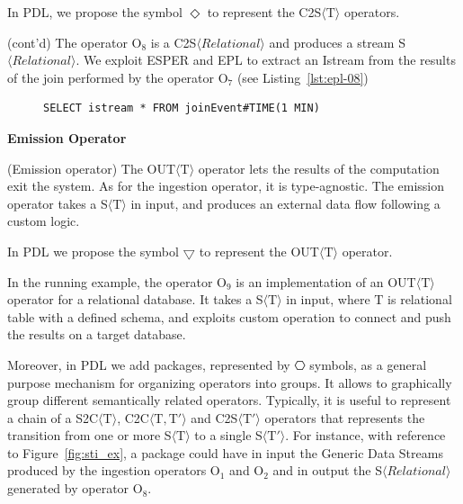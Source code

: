 \noindent
In PDL, we propose the symbol $\Diamond$ to represent the C2S$\langle\mathrm{T}\rangle$ operators. 

\begin{Example}
(cont'd) The operator O$_8$ is a C2S$\langle Relational \rangle$ and produces a stream S$\langle Relational \rangle$. We exploit ESPER and EPL to extract an Istream from the results of the join performed by the operator O$_7$ (see Listing~\ref{lst:epl-08})

\begin{figure}[ht]
\begin{minipage}{0.95\linewidth}
\begin{lstlisting}[caption={EPL query, applied by O$_8$ operator, to create a stream after the join operation.},label=lst:epl-08,style=ESPER]
     SELECT istream * FROM joinEvent#TIME(1 MIN)
\end{lstlisting}
\end{minipage}
\end{figure}
\end{Example}

\medskip
\noindent
\textbf{Emission Operator}
\medskip

\begin{Definition}
(Emission operator) The OUT$\langle\mathrm{T}\rangle$ operator lets the results of the computation exit the system. As for the ingestion operator, it is type-agnostic. The emission operator takes a S$\langle\mathrm{T}\rangle$ in input, and produces an external data flow following a custom logic.
\end{Definition}

\noindent
In PDL we propose the symbol $\bigtriangledown$ to represent the OUT$\langle\mathrm{T}\rangle$ operator. 

In the running example, the operator O$_9$ is an implementation of an OUT$\langle\mathrm{T}\rangle$ operator for a relational database. It takes a S$\langle\mathrm{T}\rangle$ in input, where $\mathrm{T}$ is relational table with a defined schema, and exploits custom operation to connect and push the results on a target database. 

Moreover, in PDL we add packages, represented by $\hexagon$ symbols, as a general purpose mechanism for organizing \river{} operators into groups. It allows to graphically group different semantically related operators.
Typically, it is useful to represent a chain of a S2C$\langle\mathrm{T}\rangle$, C2C$\langle\mathrm{T},\mathrm{T}'\rangle$ and C2S$\langle\mathrm{T}'\rangle$ operators that represents the transition from one or more S$\langle\mathrm{T}\rangle$ to a single S$\langle\mathrm{T}'\rangle$.
For instance, with reference to Figure~\ref{fig:sti_ex}, a package could have in input the Generic Data Streams produced by the ingestion operators O$_1$ and O$_2$ and in output the S$\langle Relational \rangle$ generated by operator O$_8$.

